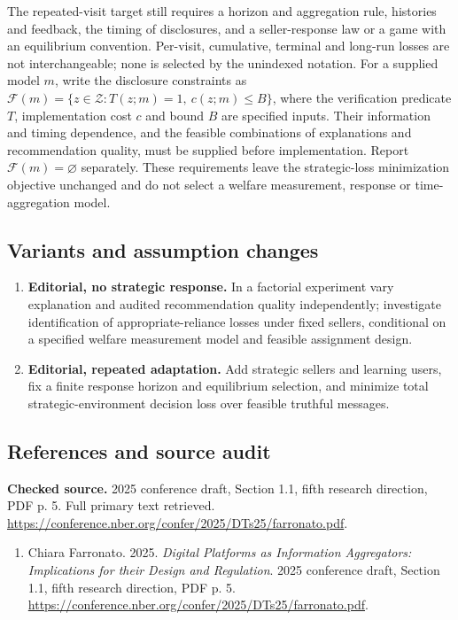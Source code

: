 \documentclass[11pt,a4paper]{article}
\begin{document}
The repeated-visit target still requires a horizon and aggregation rule, histories and feedback, the timing of disclosures, and a seller-response law or a game with an equilibrium convention. Per-visit, cumulative, terminal and long-run losses are not interchangeable; none is selected by the unindexed notation. For a supplied model \(m\), write the disclosure constraints as \(\mathcal F(m)=\{z\in\mathcal Z:T(z;m)=1,\ c(z;m)\le B\}\), where the verification predicate \(T\), implementation cost \(c\) and bound \(B\) are specified inputs. Their information and timing dependence, and the feasible combinations of explanations and recommendation quality, must be supplied before implementation. Report \(\mathcal F(m)=\varnothing\) separately. These requirements leave the strategic-loss minimization objective unchanged and do not select a welfare measurement, response or time-aggregation model.
\subsection*{Variants and assumption changes}
\begin{enumerate}
\item \textbf{Editorial, no strategic response.} In a factorial experiment vary explanation and audited recommendation quality independently; investigate identification of appropriate-reliance losses under fixed sellers, conditional on a specified welfare measurement model and feasible assignment design.
\item \textbf{Editorial, repeated adaptation.} Add strategic sellers and learning users, fix a finite response horizon and equilibrium selection, and minimize total strategic-environment decision loss over feasible truthful messages.
\end{enumerate}
\subsection*{References and source audit}
\textbf{Checked source.} 2025 conference draft, Section 1.1, fifth research direction, PDF p. 5. Full primary text retrieved. \url{https://conference.nber.org/confer/2025/DTs25/farronato.pdf}.
\begin{enumerate}\raggedright
\item\hypertarget{definitions:source:30007686:1}{} Chiara Farronato. 2025. \emph{Digital Platforms as Information Aggregators: Implications for their Design and Regulation}. 2025 conference draft, Section 1.1, fifth research direction, PDF p. 5.
\url{https://conference.nber.org/confer/2025/DTs25/farronato.pdf}.
\end{enumerate}
\end{document}
